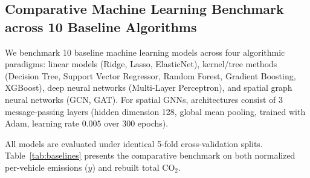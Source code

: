 \documentclass[journal]{IEEEtran}
\begin{document}
\subsection{Comparative Machine Learning Benchmark across 10 Baseline Algorithms}
We benchmark 10 baseline machine learning models across four algorithmic paradigms: linear models (Ridge, Lasso, ElasticNet), kernel/tree methods (Decision Tree, Support Vector Regressor, Random Forest, Gradient Boosting, XGBoost), deep neural networks (Multi-Layer Perceptron), and spatial graph neural networks (GCN, GAT). For spatial GNNs, architectures consist of 3 message-passing layers (hidden dimension 128, global mean pooling, trained with Adam, learning rate $0.005$ over 300 epochs).

All models are evaluated under identical 5-fold cross-validation splits. Table~\ref{tab:baselines} presents the comparative benchmark on both normalized per-vehicle emissions ($y$) and rebuilt total $\text{CO}_2$.
\end{document}
